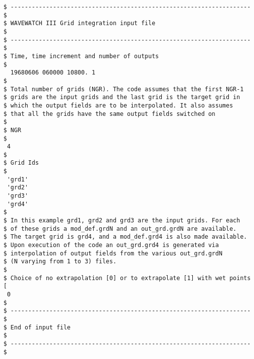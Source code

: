 \begin{footnotesize}
\begin{verbatim}
$ -------------------------------------------------------------------- $
$ WAVEWATCH III Grid integration input file                            $
$ -------------------------------------------------------------------- $
$ Time, time increment and number of outputs
$
  19680606 060000 10800. 1
$
$ Total number of grids (NGR). The code assumes that the first NGR-1  
$ grids are the input grids and the last grid is the target grid in 
$ which the output fields are to be interpolated. It also assumes
$ that all the grids have the same output fields switched on 
$
$ NGR
$
 4
$
$ Grid Ids
$
 'grd1'
 'grd2'
 'grd3'
 'grd4'
$
$ In this example grd1, grd2 and grd3 are the input grids. For each
$ of these grids a mod_def.grdN and an out_grd.grdN are available.
$ The target grid is grd4, and a mod_def.grd4 is also made available.
$ Upon execution of the code an out_grd.grd4 is generated via
$ interpolation of output fields from the various out_grd.grdN
$ (N varying from 1 to 3) files.
$
$ Choice of no extrapolation [0] or to extrapolate [1] with wet points [
 0
$
$ -------------------------------------------------------------------- $
$ End of input file                                                    $
$ -------------------------------------------------------------------- $
\end{verbatim}
\end{footnotesize}
